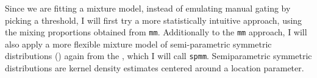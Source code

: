 Since we are fitting a mixture model, instead of emulating manual gating by picking a threshold,
I will first try a more statistically intuitive approach, using the mixing proportions obtained from \texttt{mm}.
Additionally to the \texttt{mm} approach, I will also apply a more flexible mixture model of semi-parametric symmetric distributions () again from the , which I will call \texttt{spmm}.
Semiparametric symmetric distributions are kernel density estimates centered around a location parameter.

